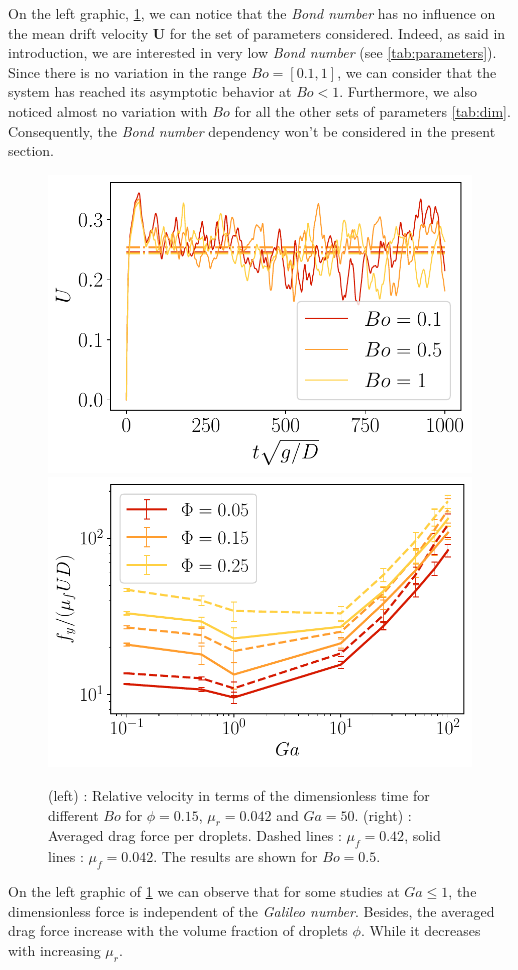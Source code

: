 On the left graphic, \ref{fig:avgF}, we can notice that the \textit{Bond number} has no influence on the mean drift velocity $\bm{U}$ for the set of parameters considered.
Indeed, as said in introduction, we are interested in very low \textit{Bond number} (see \ref{tab:parameters}).
Since there is no variation in the range $Bo = [0.1,1]$, we can consider that the system has reached its asymptotic behavior at $Bo<1$.
Furthermore, we also noticed almost no variation with $Bo$ for all the other sets of parameters \ref{tab:dim}.
Consequently, the \textit{Bond number} dependency won't be considered in the present section. 
\begin{figure}[h!]
    \centering
    \includegraphics[height=0.22\textheight]{image/N_10/Favg/Bosdep_Ga_50.pdf}
    \includegraphics[height=0.22\textheight]{image/N_10/Favg/F_mu_Bo_0_5.pdf}
    \caption{(left) : Relative velocity in terms of the dimensionless time for different $Bo$ for $\phi = 0.15$, $\mu_r = 0.042$ and $Ga = 50$. (right) : Averaged drag force per droplets. Dashed lines : $\mu_f = 0.42$, solid lines : $\mu_f = 0.042$. The results are shown for $Bo = 0.5$.} 
    \label{fig:avgF}
\end{figure}
On the left graphic of \ref{fig:avgF} we can observe that for some studies at $Ga\le 1$, the dimensionless force is independent of the  \textit{Galileo number}. 
Besides, the averaged drag force increase with the volume fraction of droplets $\phi$.
While it decreases with increasing $\mu_r$. 

